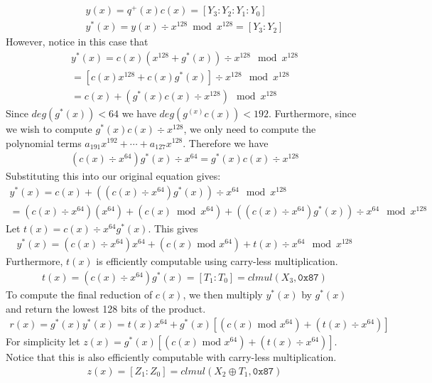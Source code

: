 \documentclass[hctr2.tex]{subfiles}
\begin{document}
\begin{gather*}
       y(x) = q^+(x)c(x) = [Y_3 : Y_2 : Y_1 : Y_0]\\
       y^*(x) = y(x) \div x^{128} \bmod x^{128} = [Y_3 : Y_2]
\end{gather*}
However, notice in this case that
\begin{gather*}
       y^*(x) = c(x)(x^{128} + g^*(x)) \div x^{128} \mod x^{128}\\
       = [c(x)x^{128} + c(x)g^*(x)] \div x^{128} \mod x^{128}\\
       = c(x) + (g^*(x)c(x) \div x^{128}) \mod x^{128}
\end{gather*}
Since $deg(g^*(x)) < 64$ we have $deg(g^(x)c(x)) < 192$. Furthermore, since we wish to compute $g^*(x)c(x) \div x^{128}$, we only need to compute the polynomial terms $a_{191}x^{192} + \cdots + a_{127}x^{128}$. Therefore we have
\begin{align*}
       (c(x) \div x^{64})g^*(x) \div x^{64} = g^*(x)c(x) \div x^{128}
\end{align*}
Substituting this into our original equation gives:
\begin{gather*}
       y^*(x) = c(x) + ((c(x) \div x^{64})g^*(x)) \div x^{64} \mod x^{128}\\
       = (c(x) \div x^{64})(x^{64}) + (c(x) \bmod x^{64}) + ((c(x) \div x^{64})g^*(x)) \div x^{64} \mod x^{128}
\end{gather*}
Let $t(x) = c(x) \div x^{64}g^*(x)$. This gives
\begin{align*}
       y^*(x) = (c(x) \div x^{64})x^{64} + (c(x) \text{ mod } x^{64}) + t(x) \div x^{64} \mod x^{128}
\end{align*}
Furthermore, $t(x)$ is efficiently computable using carry-less multiplication.
\begin{align*}
       t(x) = (c(x) \div x^{64})g^*(x) = [T_1 : T_0] = clmul(X_3, \texttt{0x87})
\end{align*}
To compute the final reduction of $c(x)$, we then multiply $y^*(x)$ by $g^*(x)$ and return the lowest 128 bits of the product.
\begin{align*}
       r(x) = g^*(x)y^*(x) = t(x)x^{64} + g^*(x)\left[(c(x) \text{ mod } x^{64}) + (t(x) \div x^{64})\right]
\end{align*}
For simplicity let $z(x) = g^*(x)\left[(c(x) \text{ mod } x^{64}) + (t(x) \div x^{64})\right]$. Notice that this is also efficiently computable with carry-less multiplication.
\begin{align*}
       z(x) = [Z_1 : Z_0] = clmul(X_2 \oplus T_1,\texttt{0x87})
\end{align*}
\end{document}

